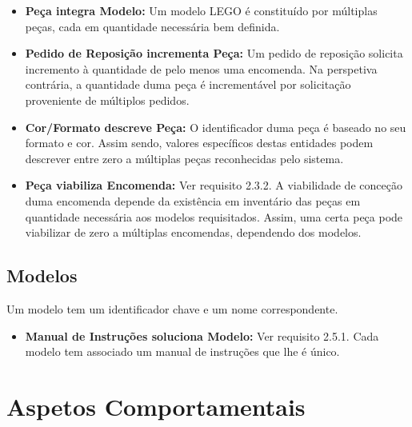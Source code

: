             \begin{itemize}
                \item \textbf{Peça integra Modelo:} Um modelo LEGO é constituído por múltiplas peças, cada em quantidade necessária bem definida. 
    
                \item \textbf{Pedido de Reposição incrementa Peça:} Um pedido de reposição solicita incremento à quantidade de pelo menos uma encomenda. Na perspetiva contrária, a quantidade duma peça é incrementável por solicitação proveniente de múltiplos pedidos.
    
                \item \textbf{Cor/Formato descreve Peça:} O identificador duma peça é baseado no seu formato e cor. Assim sendo, valores específicos destas entidades podem descrever entre zero a múltiplas peças reconhecidas pelo sistema.
    
                \item \textbf{Peça viabiliza Encomenda:} Ver requisito 2.3.2. A viabilidade de conceção duma encomenda depende da existência em inventário das peças em quantidade necessária aos modelos requisitados. Assim, uma certa peça pode viabilizar de zero a múltiplas encomendas, dependendo dos modelos.
            
            \end{itemize}

        \subsection{Modelos}

            Um modelo tem um identificador chave e um nome correspondente.
            
            \begin{itemize}
                \item \textbf{Manual de Instruções soluciona Modelo:} Ver requisito 2.5.1. Cada modelo tem associado um manual de instruções que lhe é único.
            \end{itemize}

            

    \newpage    
    \section{Aspetos Comportamentais}

